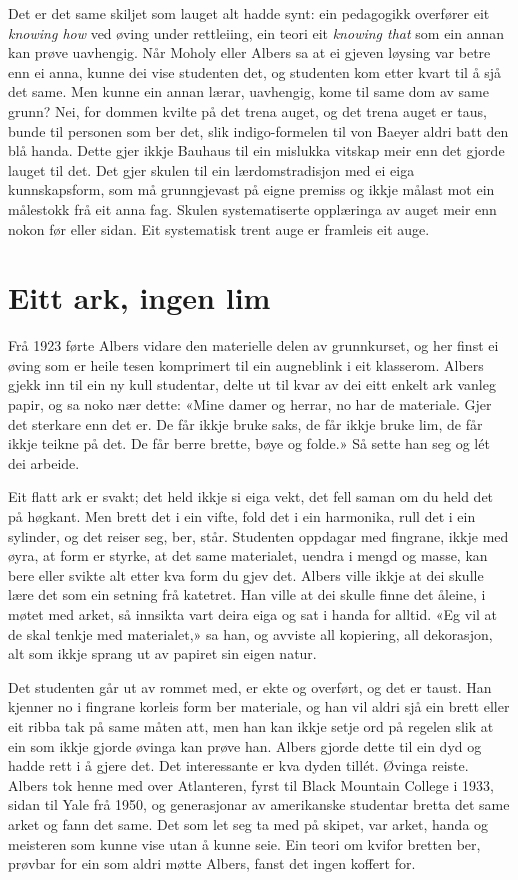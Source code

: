 Det er det same skiljet som lauget alt hadde synt: ein pedagogikk overfører eit \emph{knowing how} ved øving under rettleiing, ein teori eit \emph{knowing that} som ein annan kan prøve uavhengig. Når Moholy eller Albers sa at ei gjeven løysing var betre enn ei anna, kunne dei vise studenten det, og studenten kom etter kvart til å sjå det same. Men kunne ein annan lærar, uavhengig, kome til same dom av same grunn? Nei, for dommen kvilte på det trena auget, og det trena auget er taus, bunde til personen som ber det, slik indigo-formelen til von Baeyer aldri batt den blå handa. Dette gjer ikkje Bauhaus til ein mislukka vitskap meir enn det gjorde lauget til det. Det gjer skulen til ein lærdomstradisjon med ei eiga kunnskapsform, som må grunngjevast på eigne premiss og ikkje målast mot ein målestokk frå eit anna fag. Skulen systematiserte opplæringa av auget meir enn nokon før eller sidan. Eit systematisk trent auge er framleis eit auge.

\section{Eitt ark, ingen lim}

Frå 1923 førte Albers vidare den materielle delen av grunnkurset, og her finst ei øving som er heile tesen komprimert til ein augneblink i eit klasserom. Albers gjekk inn til ein ny kull studentar, delte ut til kvar av dei eitt enkelt ark vanleg papir, og sa noko nær dette: «Mine damer og herrar, no har de materiale. Gjer det sterkare enn det er. De får ikkje bruke saks, de får ikkje bruke lim, de får ikkje teikne på det. De får berre brette, bøye og folde.» Så sette han seg og lét dei arbeide.

Eit flatt ark er svakt; det held ikkje si eiga vekt, det fell saman om du held det på høgkant. Men brett det i ein vifte, fold det i ein harmonika, rull det i ein sylinder, og det reiser seg, ber, står. Studenten oppdagar med fingrane, ikkje med øyra, at form er styrke, at det same materialet, uendra i mengd og masse, kan bere eller svikte alt etter kva form du gjev det. Albers ville ikkje at dei skulle lære det som ein setning frå katetret. Han ville at dei skulle finne det åleine, i møtet med arket, så innsikta vart deira eiga og sat i handa for alltid. «Eg vil at de skal tenkje med materialet,» sa han, og avviste all kopiering, all dekorasjon, alt som ikkje sprang ut av papiret sin eigen natur.

Det studenten går ut av rommet med, er ekte og overført, og det er taust. Han kjenner no i fingrane korleis form ber materiale, og han vil aldri sjå ein brett eller eit ribba tak på same måten att, men han kan ikkje setje ord på regelen slik at ein som ikkje gjorde øvinga kan prøve han. Albers gjorde dette til ein dyd og hadde rett i å gjere det. Det interessante er kva dyden tillét. Øvinga reiste. Albers tok henne med over Atlanteren, fyrst til Black Mountain College i 1933, sidan til Yale frå 1950, og generasjonar av amerikanske studentar bretta det same arket og fann det same. Det som let seg ta med på skipet, var arket, handa og meisteren som kunne vise utan å kunne seie. Ein teori om kvifor bretten ber, prøvbar for ein som aldri møtte Albers, fanst det ingen koffert for.

